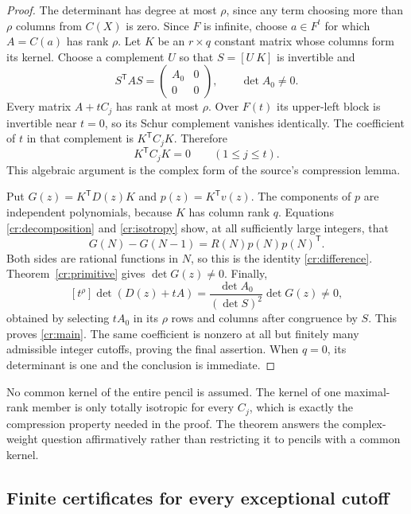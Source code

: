 \begin{proof}
The determinant has degree at most $\rho$, since any term choosing
more than $\rho$ columns from $C(X)$ is zero.  Since $F$ is infinite,
choose $a\in F^t$ for which $A=C(a)$ has rank $\rho$.  Let $K$
be an $r\times q$ constant matrix whose columns form its kernel.
Choose a complement $U$ so that $S=[U\ K]$ is invertible and
\[
 S^{\mathsf T}AS=\begin{pmatrix}A_0&0\\0&0\end{pmatrix},
 \qquad\det A_0\ne0.
\]
Every matrix $A+tC_j$ has rank at most $\rho$.  Over $F(t)$
its upper-left block is invertible near $t=0$, so its Schur complement
vanishes identically.  The coefficient of $t$ in that complement is
$K^{\mathsf T}C_jK$.  Therefore
\begin{equation}\label{cr:isotropy}
 K^{\mathsf T}C_jK=0\qquad(1\le j\le t).
\end{equation}
This algebraic argument is the complex form of the source's
compression lemma.

Put $G(z)=K^{\mathsf T}D(z)K$ and $p(z)=K^{\mathsf T}v(z)$.
The components of $p$ are independent polynomials, because $K$
has column rank $q$.  Equations \eqref{cr:decomposition} and
\eqref{cr:isotropy} show, at all sufficiently large integers, that
\[
 G(N)-G(N-1)=R(N)p(N)p(N)^{\mathsf T}.
\]
Both sides are rational functions in $N$, so this is the identity
\eqref{cr:difference}.  Theorem~\ref{cr:primitive} gives
$\det G(z)\ne0$.  Finally,
\begin{equation}\label{cr:direction}
 [t^\rho]\det(D(z)+tA)
   =\frac{\det A_0}{(\det S)^2}\det G(z)\ne0,
\end{equation}
obtained by selecting $tA_0$ in its $\rho$ rows and columns after
congruence by $S$.  This proves \eqref{cr:main}.  The same
coefficient is nonzero at all but finitely many admissible integer
cutoffs, proving the final assertion.  When $q=0$, its determinant
is one and the conclusion is immediate.
\end{proof}

No common kernel of the entire pencil is assumed.  The kernel of
one maximal-rank member is only totally isotropic for every $C_j$,
which is exactly the compression property needed in the proof.
The theorem answers the complex-weight question affirmatively rather
than restricting it to pencils with a common kernel.

\subsection{Finite certificates for every exceptional cutoff}


